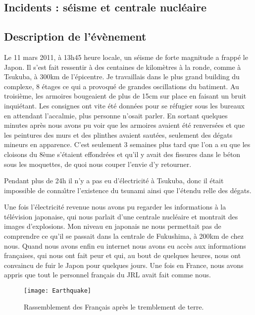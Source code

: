 \documentclass[11pt,journal]{RapportFR}
\begin{document}
\begin{CJK*}{UTF8}{min}
\section{Incidents : s\'eisme et centrale nucl\'eaire}
\label{sec_incident}
\subsection{Description de l'\'ev\`enement}

Le 11 mars 2011, \`a 13h45 heure locale, un s\'eisme de forte magnitude a frapp\'e le Japon. Il s'est fait ressentir \`a des centaines de kilom\`etres \`a la ronde, comme \`a Tsukuba, \`a 300km de l'\'epicentre. Je travaillais dans le plus grand building du complexe, 8 \'etages ce qui a provoqu\'e de grandes oscillations du batiment. Au troisi\`eme, les armoires bougeaient de plus de 15cm sur place en faisant un bruit inqui\'etant. Les consignes ont vite \'et\'e donn\'ees pour se r\'efugier sous les bureaux en attendant l'accalmie, plus personne n'osait parler.
En sortant quelques minutes apr\`es nous avons pu voir que les armoires avaient \'et\'e renvers\'ees et que les peintures des murs et des plinthes avaient saut\'ees, seulement des d\'egats mineurs en apparence. C'est seulement 3 semaines plus tard que l'on a su que les cloisons du 8{\`eme} s'\'etaient effondr\'ees et qu'il y avait des fissures dans le b\'eton sous les moquettes, de quoi nous couper l'envie d'y retourner.

Pendant plus de 24h il n'y a pas eu d'\'electricit\'e \`a Tsukuba, donc il \'etait impossible de conna\^\i tre l'existence du tsunami ainsi que l'\'etendu relle des d\'egats.

Une fois l'\'electricit\'e revenue nous avons pu regarder les informations \`a la t\'el\'evision japonaise, qui nous parlait d'une centrale nucl\'eaire et montrait des images d'explosions. Mon niveau en japonais ne nous permettait pas de comprendre ce qu'il se passait dans la centrale de Fukushima, \`a 200km de chez nous. Quand nous avons enfin eu internet nous avons eu acc\`es aux informations fran\c caises, qui nous ont fait peur et qui, au bout de quelques heures, nous ont convaincu de fuir le Japon pour quelques jours.
Une fois en France, nous avons appris que tout le personnel fran\c cais du JRL avait fait comme nous.

\begin{figure}[!t]
\centering
\texttt{[image: Earthquake]}
\caption{Rassemblement des Fran\c cais apr\`es le tremblement de terre.}
\label{fig_earthquake}
\end{figure}


\end{CJK*}
\end{document}

